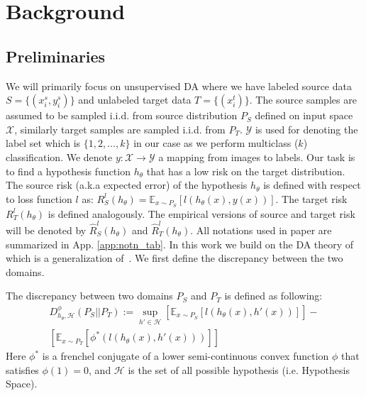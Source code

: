 \documentclass[table,dvipsnames]{article}
\theoremstyle{plain}
\theoremstyle{definition}
\theoremstyle{remark}
\begin{document}
\section{Background}
\subsection{Preliminaries} 
We will primarily focus on unsupervised DA where we have labeled source data $S = \{ (x_i^s, y_i^s) \} $ and unlabeled target data $T = \{ (x_i^t) \}$. The source samples are assumed to be sampled i.i.d. from source distribution $P_S$ defined on input space $\mathcal{X}$, similarly target samples are sampled i.i.d. from $P_T$. $\mathcal{Y}$ is used for denoting the label set which is $\{1, 2,  \dots, k\}$ in our case as we perform multiclass ($k$) classification. We denote $y : \mathcal{X} \rightarrow \mathcal{Y}$ a mapping from images to labels. Our task is to find a hypothesis function $h_{\theta}$ that {has a low risk on the target distribution}. The source risk (a.k.a expected error) of the hypothesis $h_{\theta}$ is defined with respect to loss function $l$ as: $R_{S}^{l}(h_{\theta}) = \mathbb{E}_{x\sim P_S}[l(h_{\theta}(x), y(x))]$. The target risk $R_T^l(h_\theta)$ is defined analogously. The empirical versions of source and target risk will be denoted by $\hat{R}_S^l(h_\theta)$ and $\hat{R}_T^l(h_\theta)$. All notations used in paper are summarized in App. \ref{app:notn_tab}. In this work we build on the DA theory of \citep{acuna2021f} {which is a generalization of~\citet{ben2010theory}}. 
We first define the discrepancy between the two domains.



\begin{definition} The discrepancy between two domains $P_S$ and $P_T$ is defined as following:
\begin{equation}
    \begin{split}
    D_{h_{\theta}, \mathcal{H}}^{\phi}(P_S || P_T) := \sup_{h' \in \mathcal{H}} [\mathbb{E}_{x \sim P_S}[l(h_{\theta}(x),h'(x))]] - \\ [\mathbb{E}_{x \sim P_T}[\phi^*(l(h_{\theta}(x),h'(x)))]]
\end{split}
\end{equation}
Here $\phi^*$ is a frenchel conjugate of a lower semi-continuous convex function $\phi$  that satisfies $\phi(1) = 0$, and $\mathcal{H}$ is the set of all possible hypothesis (i.e. Hypothesis Space).
\end{definition}
\end{document}

